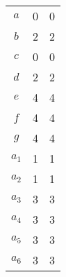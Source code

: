 \begin{center}
\begin{minipage}[t]{.4\linewidth}
\begin{longtable}[c]{| c | c | c|}
     \hline
     \endfirsthead
     \hline
     \endfoot
     $a$ & 0 & 0\\
     $b$ & 2 & 2\\
     $c$ & 0 & 0\\
     $d$ & 2 & 2\\
     $e$ & 4 & 4\\
     $f$ & 4 & 4\\
     $g$ & 4 & 4\\
     $a_1$ & 1 & 1\\
     $a_2$ & 1 & 1\\
     $a_3$ & 3 & 3\\
     $a_4$ & 3 & 3\\
     $a_5$ & 3 & 3\\
     $a_6$ & 3 & 3\\
     \hline
\end{longtable}
\end{minipage}
\end{center}

